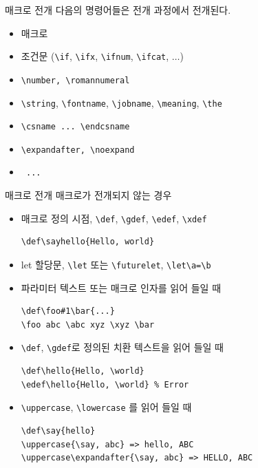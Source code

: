 \documentclass{beamer}
\begin{document}
%
\begin{frame}[fragile]{매크로 전개}
  다음의 명령어들은 전개 과정에서 전개된다.
  \begin{itemize}
  \item 매크로
  \item 조건문 (\verb+\if+, \verb+\ifx+, \verb+\ifnum+, \verb+\ifcat+, $\ldots$)
  \item \verb+\number, \romannumeral+
  \item \verb+\string+, \verb+\fontname+, \verb+\jobname+,
    \verb+\meaning+, \verb+\the+
  \item \verb+\csname ... \endcsname+
  \item \verb+\expandafter, \noexpand+
  \item \verb+ ... +
  \end{itemize}
\end{frame}


%
\begin{frame}[fragile]{매크로 전개}
  매크로가 전개되지 않는 경우
  \begin{itemize}
  \item 매크로 정의 시점, \verb+\def+, \verb+\gdef+, \verb+\edef+, \verb+\xdef+
\begin{Verbatim}[fontsize=\small, formatcom=\color{blue}]
\def\sayhello{Hello, world}
\end{Verbatim}
  \item let 할당문, \verb+\let+ 또는 \verb+\futurelet+,
  {\color{blue} \verb+\let\a=\b+}
  \item 파라미터 텍스트 또는 매크로 인자를 읽어 들일 때
\begin{Verbatim}[fontsize=\small, formatcom=\color{blue}]
\def\foo#1\bar{...}
\foo abc \abc xyz \xyz \bar
\end{Verbatim}
  \item \verb+\def+, \verb+\gdef+로 정의된 치환 텍스트을 읽어 들일 때
\begin{Verbatim}[fontsize=\small, formatcom=\color{blue}] 
\def\hello{Hello, \world}
\edef\hello{Hello, \world} % Error
\end{Verbatim}
  \item \verb+\uppercase+, \verb+\lowercase+ 를 읽어 들일 때
\begin{Verbatim}[fontsize=\small, formatcom=\color{blue}]
\def\say{hello}
\uppercase{\say, abc} => hello, ABC
\uppercase\expandafter{\say, abc} => HELLO, ABC  
\end{Verbatim}
  \end{itemize}
\end{frame}
\end{document}
